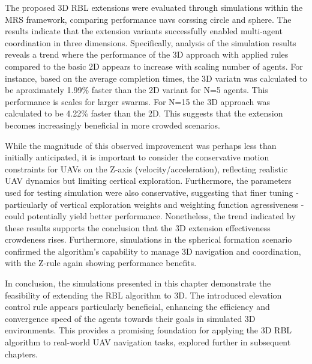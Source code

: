         The proposed 3D RBL extensions were evaluated through simulations within the MRS framework, comparing performance uavs corssing circle and sphere. 
        The results indicate that the extension variants successfully enabled multi-agent coordination in three dimensions.
        Specifically, analysis of the simulation results reveals a trend where the performance of the 3D approach with applied rules compared to the basic 2D appears to increase with scaling number of agents. 
        For instance, based on the average completion times, the 3D variatn was calculated to be aproximately 1.99\% faster than the 2D variant for N=5 agents.
        This performance is scales for larger swarms.
        For N=15 the 3D approach was calculated to be 4.22\% faster than the 2D.
        This suggests that the extension becomes increasingly beneficial in more crowded scenarios.

        While the magnitude of this observed improvement was perhaps less than initially anticipated, it is important to consider the conservative motion constraints for \ac{UAV}s on the Z-axis (velocity/acceleration), reflecting realistic \ac{UAV} dynamics but limiting certical exploration.
        Furthermore, the parameters used for testing simulation were also conservative, suggesting that finer tuning - particularly of vertical exploration weights and weighting function agressiveness - could potentially yield better performance.
        Nonetheless, the trend indicated by these results supports the conclusion that the 3D extension effectiveness crowdeness rises.
        Furthermore, simulations in the spherical formation scenario confirmed the algorithm's capability to manage 3D navigation and coordination, with the Z-rule again showing performance benefits.

        In conclusion, the simulations presented in this chapter demonstrate the feasibility of extending the RBL algorithm to 3D. 
        The introduced elevation control rule appears particularly beneficial, enhancing the efficiency and convergence speed of the agents towards their goals in simulated 3D environments. 
        This provides a promising foundation for applying the 3D RBL algorithm to real-world UAV navigation tasks, explored further in subsequent chapters.


